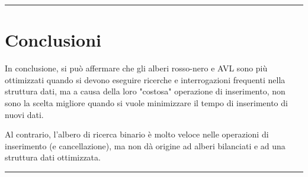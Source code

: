 \documentclass[a4paper,12pt]{article}
\begin{document}
    \par\noindent\rule{\textwidth}{0.2pt}
    \section{Conclusioni}
    In conclusione, si può affermare che gli alberi rosso-nero e AVL sono più ottimizzati quando si devono eseguire
    ricerche e interrogazioni frequenti nella struttura dati, ma a causa della loro "costosa" operazione di
    inserimento, non sono la scelta migliore quando si vuole minimizzare il tempo di inserimento di nuovi dati.

    Al contrario, l'albero di ricerca binario è molto veloce nelle operazioni di inserimento (e cancellazione), ma
    non dà origine ad alberi bilanciati e ad una struttura dati ottimizzata.

    \par\noindent\rule{\textwidth}{0.2pt}
\end{document}
